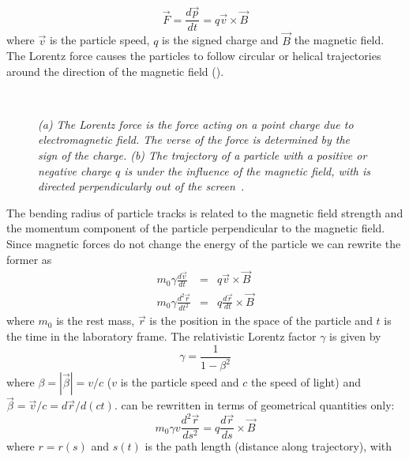 \begin{equation}
  \vec{F}=\frac{d\vec{p}}{dt}=q\vec{v}\times\vec{B}
\end{equation}
where $\vec{v}$ is the particle speed, $q$ is the signed charge and $\vec{B}$
the magnetic field.  The Lorentz force causes the particles to follow circular
or helical trajectories around the direction of the magnetic field
().
\begin{figure}
  \centering {}
   \\
  \caption{\textit{(a) The Lorentz force is the force acting on a point charge
      due to electromagnetic field. The verse of the force is determined by the
      sign of the charge. (b) The trajectory of a particle with a positive or
      negative charge $q$ is under the influence of the magnetic field, with is
      directed perpendicularly out of the screen~\cite{Garutti}.}}\label{campoB}
\end{figure}
The bending radius of particle tracks is related to the magnetic field strength
and the momentum component of the particle
perpendicular to the magnetic field.\\
Since magnetic forces do not change the energy of the particle we can rewrite
the former as
\begin{eqnarray}\label{gamma}
  m_{0}\gamma\frac{d\vec{v}}{dt}&=&q\vec{v}\times\vec{B} \nonumber\\
  m_{0}\gamma\frac{d^{2}\vec{r}}{dt^{2}}&=&q\frac{d\vec{r}}{dt}\times\vec{B}
\end{eqnarray}
where $m_{0}$ is the rest mass, $\vec{r}$ is the position in the space of the
particle and $t$ is the time in the laboratory frame. The relativistic Lorentz
factor $\gamma$ is given by
\begin{equation}
  \gamma =\frac{1}{1-\beta^2}
\end{equation}
where $\beta=|\vec \beta|=v/c$ ($v$ is the particle speed and $c$ the speed of
light) and $\vec \beta=\vec v/c=d\vec r/d(ct)$.  can be rewritten in
terms of geometrical quantities only:
\begin{equation}
  m_{0}\gamma v\frac{d^{2}\vec{r}}{ds^{2}}=q\frac{d\vec{r}}{ds}\times\vec{B}
\end{equation}
where $r=r(s)$ and $s(t)$ is the path length (distance along trajectory), with
